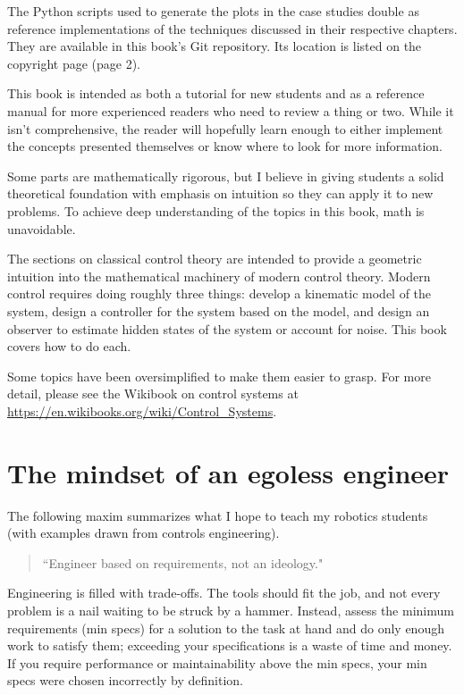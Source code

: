 The Python scripts used to generate the plots in the case studies double as
reference implementations of the techniques discussed in their respective
chapters. They are available in this book's Git repository. Its location is
listed on the copyright page (page 2).

This book is intended as both a tutorial for new students and as a reference
manual for more experienced readers who need to review a thing or two. While it
isn't comprehensive, the reader will hopefully learn enough to either implement
the concepts presented themselves or know where to look for more information.

Some parts are mathematically rigorous, but I believe in giving students a solid
theoretical foundation with emphasis on intuition so they can apply it to new
problems. To achieve deep understanding of the topics in this book, math is
unavoidable.

The sections on classical control theory are intended to provide a geometric
intuition into the mathematical machinery of modern control theory. Modern
control requires doing roughly three things: develop a kinematic model of the
system, design a controller for the system based on the model, and design an
observer to estimate hidden states of the system or account for noise. This book
covers how to do each.

Some topics have been oversimplified to make them easier to grasp. For more
detail, please see the Wikibook on control systems at
\url{https://en.wikibooks.org/wiki/Control_Systems}.

\section{The mindset of an egoless engineer}

The following maxim summarizes what I hope to teach my robotics students (with
examples drawn from controls engineering).

\begin{quote}
  ``Engineer based on requirements, not an ideology."
\end{quote}

Engineering is filled with trade-offs. The tools should fit the job, and not
every problem is a nail waiting to be struck by a hammer. Instead, assess the
minimum requirements (min specs) for a solution to the task at hand and do only
enough work to satisfy them; exceeding your specifications is a waste of time
and money. If you require performance or maintainability above the min specs,
your min specs were chosen incorrectly by definition.


